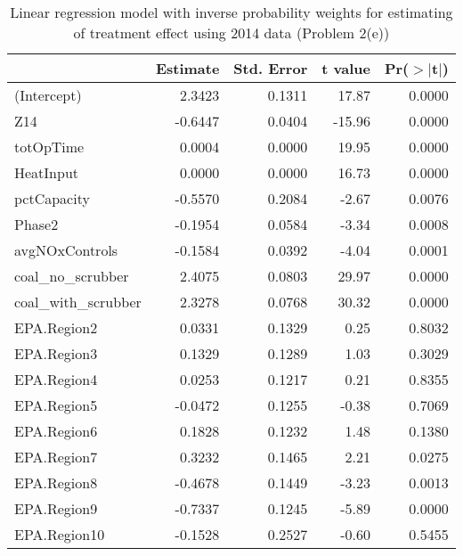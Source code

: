 \begin{table}[ht]
\centering
\begin{tabular}{lrrrr}
  \toprule
 & Estimate & Std. Error & t value & Pr($>$$|$t$|$) \\ 
  \midrule
(Intercept) & 2.3423 & 0.1311 & 17.87 & 0.0000 \\ 
  Z14 & -0.6447 & 0.0404 & -15.96 & 0.0000 \\ 
  totOpTime & 0.0004 & 0.0000 & 19.95 & 0.0000 \\ 
  HeatInput & 0.0000 & 0.0000 & 16.73 & 0.0000 \\ 
  pctCapacity & -0.5570 & 0.2084 & -2.67 & 0.0076 \\ 
  Phase2 & -0.1954 & 0.0584 & -3.34 & 0.0008 \\ 
  avgNOxControls & -0.1584 & 0.0392 & -4.04 & 0.0001 \\ 
  coal\_no\_scrubber & 2.4075 & 0.0803 & 29.97 & 0.0000 \\ 
  coal\_with\_scrubber & 2.3278 & 0.0768 & 30.32 & 0.0000 \\ 
  EPA.Region2 & 0.0331 & 0.1329 & 0.25 & 0.8032 \\ 
  EPA.Region3 & 0.1329 & 0.1289 & 1.03 & 0.3029 \\ 
  EPA.Region4 & 0.0253 & 0.1217 & 0.21 & 0.8355 \\ 
  EPA.Region5 & -0.0472 & 0.1255 & -0.38 & 0.7069 \\ 
  EPA.Region6 & 0.1828 & 0.1232 & 1.48 & 0.1380 \\ 
  EPA.Region7 & 0.3232 & 0.1465 & 2.21 & 0.0275 \\ 
  EPA.Region8 & -0.4678 & 0.1449 & -3.23 & 0.0013 \\ 
  EPA.Region9 & -0.7337 & 0.1245 & -5.89 & 0.0000 \\ 
  EPA.Region10 & -0.1528 & 0.2527 & -0.60 & 0.5455 \\ 
   \bottomrule
\end{tabular}
\caption{Linear regression model with inverse probability weights for estimating of treatment effect using 2014 data (Problem 2(e))} 
\label{tab:lm-2e-14}
\end{table}


